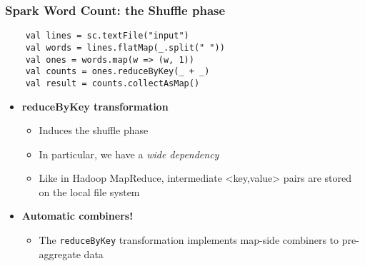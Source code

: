 \begin{frame}[fragile] 
\frametitle{Spark Word Count: the Shuffle phase}
\begin{lstlisting}
	val lines = sc.textFile("input")
	val words = lines.flatMap(_.split(" ")) 
	val ones = words.map(w => (w, 1))
	val counts = ones.reduceByKey(_ + _) 
	val result = counts.collectAsMap()
\end{lstlisting}

\begin{itemize}
	\item {\bf reduceByKey transformation}
	\begin{itemize}
		\item Induces the shuffle phase
		\item In particular, we have a \emph{wide dependency}
		\item Like in Hadoop MapReduce, intermediate <key,value> pairs are stored on the local file system
	\end{itemize}

	\vspace{10pt}

	\item {\bf Automatic combiners!}
	\begin{itemize}
		\item The \texttt{reduceByKey} transformation implements map-side combiners to pre-aggregate data
	\end{itemize}
\end{itemize}

\end{frame}
